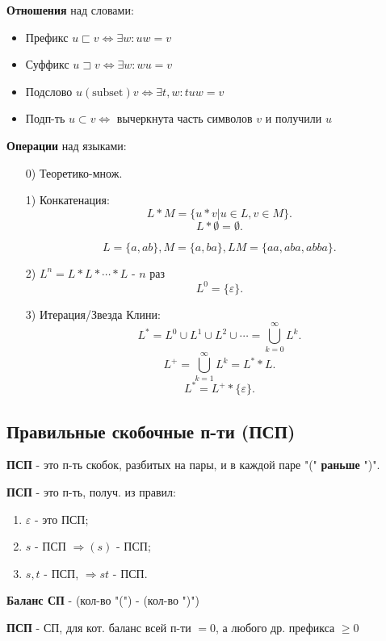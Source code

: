 \textbf{Отношения} над словами:
\begin{itemize}
    \item Префикс $u \sqsubset v \iff \exists w \colon uw = v$ 
    \item Суффикс $u \sqsupset v \iff \exists w \colon wu = v$
    \item Подслово $u (\text{subset}) v \iff \exists t, w \colon tuw = v$
    \item Подп-ть $u \subset v \iff$ вычеркнута часть символов $v$ и получили $u$
\end{itemize}

\textbf{Операции} над языками:
\begin{enumerate}
    \item [0) ] Теоретико-множ.
    \item [1) ] Конкатенация:
        \[
        L * M = \{u * v | u \in L, v \in M\}
        .\] 
        \[
        L * \emptyset = \emptyset
        .\] 
        \begin{example}
        \[
        L = \{a, ab\}, M = \{a, ba\}, LM = \{aa, aba, abba\}
        .\] 
        \end{example}

    \item [2) ] $L^{n} = L * L * \cdots * L$ - $n$ раз
        \[
        L^{0} = \{\varepsilon\} 
        .\] 
    \item [3) ] Итерация/Звезда Клини:
        \[
        L^{*} = L^{0} \cup L^{1} \cup L^{2} \cup \cdots = \bigcup_{k = 0}^{\infty} L^{k} 
        .\] 
        \[
        L^{+} = \bigcup_{k = 1}^{\infty} L^{k} = L^{*} * L
        .\] 
        \[
        L^{*} = L^{+} * \{\varepsilon\} 
        .\] 
        
\end{enumerate}

\subsection{Правильные скобочные п-ти (ПСП)}

\begin{definition}
    \textbf{ПСП} - это п-ть скобок, разбитых на пары, и в каждой паре "(" \textbf{раньше} ")".
\end{definition}
\begin{definition}
    \textbf{ПСП} - это п-ть, получ. из правил:
    \begin{enumerate}
        \item $\varepsilon$ - это ПСП;
        \item $s$ - ПСП $\Rightarrow (s)$ - ПСП;
        \item $s, t$ -  ПСП, $\Rightarrow st$ - ПСП.
    \end{enumerate}
\end{definition}
\begin{definition}
\textbf{Баланс СП} - (кол-во "(") - (кол-во ")")
\end{definition}
\begin{definition}
    \textbf{ПСП} - СП, для кот. баланс всей п-ти $ = 0$, а любого др. префикса $ \geq 0$
\end{definition}

